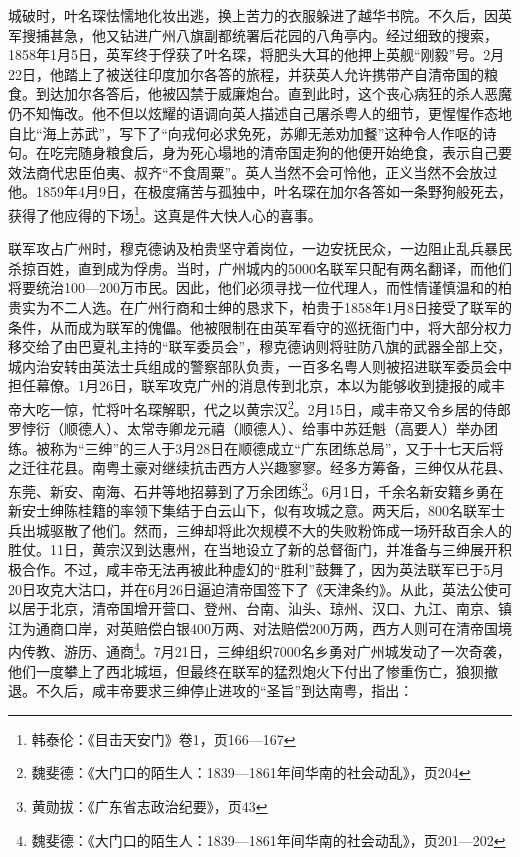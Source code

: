 城破时，叶名琛怯懦地化妆出逃，换上苦力的衣服躲进了越华书院。不久后，因英军搜捕甚急，他又钻进广州八旗副都统署后花园的八角亭内。经过细致的搜索，1858年1月5日，英军终于俘获了叶名琛，将肥头大耳的他押上英舰“刚毅”号。2月22日，他踏上了被送往印度加尔各答的旅程，并获英人允许携带产自清帝国的粮食。到达加尔各答后，他被囚禁于威廉炮台。直到此时，这个丧心病狂的杀人恶魔仍不知悔改。他不但以炫耀的语调向英人描述自己屠杀粤人的细节，更惺惺作态地自比“海上苏武”，写下了“向戎何必求免死，苏卿无恙劝加餐”这种令人作呕的诗句。在吃完随身粮食后，身为死心塌地的清帝国走狗的他便开始绝食，表示自己要效法商代忠臣伯夷、叔齐“不食周粟”。英人当然不会可怜他，正义当然不会放过他。1859年4月9日，在极度痛苦与孤独中，叶名琛在加尔各答如一条野狗般死去，获得了他应得的下场\footnote{韩泰伦：《目击天安门》卷1，页166—167}。这真是件大快人心的喜事。

联军攻占广州时，穆克德讷及柏贵坚守着岗位，一边安抚民众，一边阻止乱兵暴民杀掠百姓，直到成为俘虏。当时，广州城内的5000名联军只配有两名翻译，而他们将要统治100—200万市民。因此，他们必须寻找一位代理人，而性情谨慎温和的柏贵实为不二人选。在广州行商和士绅的恳求下，柏贵于1858年1月8日接受了联军的条件，从而成为联军的傀儡。他被限制在由英军看守的巡抚衙门中，将大部分权力移交给了由巴夏礼主持的“联军委员会”，穆克德讷则将驻防八旗的武器全部上交，城内治安转由英法士兵组成的警察部队负责，一百多名粤人则被招进联军委员会中担任幕僚。1月26日，联军攻克广州的消息传到北京，本以为能够收到捷报的咸丰帝大吃一惊，忙将叶名琛解职，代之以黄宗汉\footnote{魏斐德：《大门口的陌生人：1839—1861年间华南的社会动乱》，页204}。2月15日，咸丰帝又令乡居的侍郎罗悖衍（顺德人）、太常寺卿龙元禧（顺德人）、给事中苏廷魁（高要人）举办团练。被称为“三绅”的三人于3月28日在顺德成立“广东团练总局”，又于十七天后将之迁往花县。南粤土豪对继续抗击西方人兴趣寥寥。经多方筹备，三绅仅从花县、东莞、新安、南海、石井等地招募到了万余团练\footnote{黄勋拔：《广东省志政治纪要》，页43}。6月1日，千余名新安籍乡勇在新安士绅陈桂籍的率领下集结于白云山下，似有攻城之意。两天后，800名联军士兵出城驱散了他们。然而，三绅却将此次规模不大的失败粉饰成一场歼敌百余人的胜仗。11日，黄宗汉到达惠州，在当地设立了新的总督衙门，并准备与三绅展开积极合作。不过，咸丰帝无法再被此种虚幻的“胜利”鼓舞了，因为英法联军已于5月20日攻克大沽口，并在6月26日逼迫清帝国签下了《天津条约》。从此，英法公使可以居于北京，清帝国增开营口、登州、台南、汕头、琼州、汉口、九江、南京、镇江为通商口岸，对英赔偿白银400万两、对法赔偿200万两，西方人则可在清帝国境内传教、游历、通商\footnote{魏斐德：《大门口的陌生人：1839—1861年间华南的社会动乱》，页201—202}。7月21日，三绅组织7000名乡勇对广州城发动了一次奇袭，他们一度攀上了西北城垣，但最终在联军的猛烈炮火下付出了惨重伤亡，狼狈撤退。不久后，咸丰帝要求三绅停止进攻的“圣旨”到达南粤，指出：

